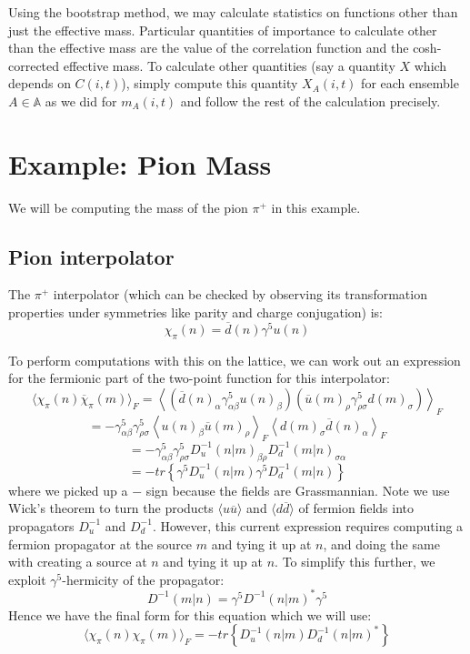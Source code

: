 \documentclass[11pt, oneside]{article}   	%
\theoremstyle{definition}
\begin{document}
Using the bootstrap method, we may calculate statistics on functions other than just the effective mass. Particular 
quantities of importance to calculate other than the effective mass are the value of the correlation function and the 
cosh-corrected effective mass. To calculate other quantities (say a quantity $X$ which depends on $C(i, t)$), simply 
compute this quantity $X_A(i, t)$ for each ensemble $A\in\mathbb A$ as we did for $m_A(i, t)$ and follow the rest of 
the calculation precisely. 

\newpage
\section{Example: Pion Mass}

We will be computing the mass of the pion $\pi^+$ in this example.

\subsection{Pion interpolator}

The $\pi^+$ interpolator (which can be checked by observing its transformation properties under symmetries like parity 
and charge conjugation) is:
\begin{equation}
	\chi_\pi(n) = \overline d(n)\gamma^5 u(n)
\end{equation}

To perform computations with this on the lattice, we can work out an expression for the fermionic part of the 
two-point function for this interpolator:
$$
	\langle\chi_\pi(n)\overline\chi_\pi(m)\rangle_F = \left\langle \left(\overline d(n)_\alpha \gamma^5_{\alpha\beta} 
	u(n)_\beta\right)\left(\overline u(m)_\rho\gamma^5_{\rho\sigma} d(m)_\sigma\right)\right\rangle_F
$$
$$
	= -\gamma^5_{\alpha\beta}\gamma^5_{\rho\sigma}\left\langle u(n)_\beta \overline u(m)_\rho\right\rangle_F
	\left\langle d(m)_\sigma\overline d(n)_\alpha\right\rangle_F
$$
$$
	= -\gamma_{\alpha\beta}^5\gamma_{\rho\sigma}^5 D^{-1}_u(n | m)_{\beta\rho} D^{-1}_d (m | n)_{\sigma\alpha}
$$
$$
	= -tr\left\{\gamma^5 D^{-1}_u (n | m) \gamma^5 D^{-1}_d (m | n)\right\}
$$
where we picked up a $-$ sign because the fields are Grassmannian. Note we use Wick's theorem to turn the products 
$\langle u \overline u\rangle$ and $\langle d\overline d\rangle$ of fermion fields into propagators $D^{-1}_u$ and 
$D^{-1}_d$. However, this current expression requires computing a fermion propagator at the source $m$ and tying 
it up at $n$, and doing the same with creating a source at $n$ and tying it up at $n$. To simplify this further, we 
exploit $\gamma^5$-hermicity of the propagator:
\begin{equation}
	D^{-1}(m | n) = \gamma^5 D^{-1}(n | m)^*\gamma^5
\end{equation}
Hence we have the final form for this equation which we will use:
\begin{equation}
	\langle\chi_\pi(n)\chi_\pi(m)\rangle_F = - tr\left\{D^{-1}_u (n | m) D^{-1}_d (n | m)^*\right\}
\end{equation}
\end{document}
